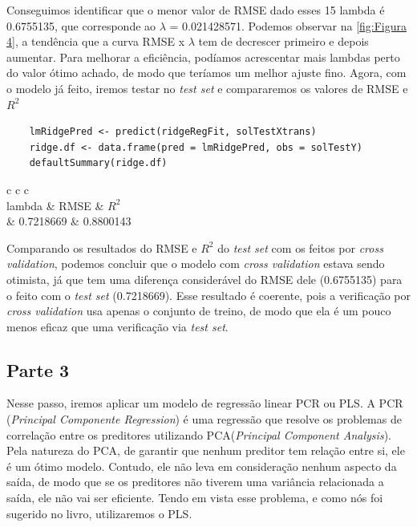 \documentclass[a4paper,11pt]{article}
\begin{document}
	Conseguimos identificar que o menor valor de RMSE dado esses 15 lambda é 0.6755135, que corresponde ao $\lambda$ = 0.021428571. Podemos observar na \autoref{fig:Figura 4}, a tendência que a curva RMSE x $\lambda$ tem de decrescer primeiro e depois aumentar. Para melhorar a eficiência, podíamos acrescentar mais lambdas perto do valor ótimo achado, de modo que teríamos um melhor ajuste fino. Agora, com o modelo já feito, iremos testar no \textit{test set} e compararemos os valores de RMSE e $R^{2}$
	\begin{verbatim}
	lmRidgePred <- predict(ridgeRegFit, solTestXtrans)
	ridge.df <- data.frame(pred = lmRidgePred, obs = solTestY)
	defaultSummary(ridge.df)
	\end{verbatim}
	\begin{center}
		\begin{tabular}{c c c}
			\\
			\hline
			lambda & RMSE & $R^{2}$ \\
			 & 0.7218669 &  0.8800143
		\end{tabular}
	\end{center}
	Comparando os resultados do RMSE e $R^{2}$ do \textit{test set} com os feitos por \textit{cross validation}, podemos concluir que o modelo com \textit{cross validation} estava sendo otimista, já que tem uma diferença considerável do RMSE dele (0.6755135) para o feito com o \textit{test set} (0.7218669). Esse resultado é coerente, pois a verificação por \textit{cross validation} usa apenas o conjunto de treino, de modo que ela é um pouco menos eficaz que uma verificação via \textit{test set}.
	\begin{center}
		\section*{Parte 3}
	\end{center}
	Nesse passo, iremos aplicar um modelo de regressão linear PCR ou PLS. A PCR (\textit{Principal Componente Regression}) é uma regressão que resolve os problemas de correlação entre os preditores utilizando PCA(\textit{Principal Component Analysis}). Pela natureza do PCA, de garantir que nenhum preditor tem relação entre si, ele é um ótimo modelo. Contudo, ele não leva em consideração nenhum aspecto da saída, de modo que se os preditores não tiverem uma variância relacionada a saída, ele não vai ser eficiente. Tendo em vista esse problema, e como nós foi sugerido no livro, utilizaremos o PLS.
\end{document}
